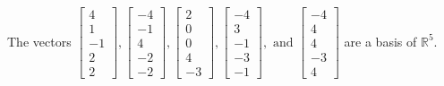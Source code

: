 \begin{exercise}
\begin{exerciseStatement}
  \end{exerciseStatement}
  \begin{exerciseAnswer}
   The vectors \(\left[\begin{array}{r}
4 \\
1 \\
-1 \\
2 \\
2
\end{array}\right] , \left[\begin{array}{r}
-4 \\
-1 \\
4 \\
-2 \\
-2
\end{array}\right] , \left[\begin{array}{r}
2 \\
0 \\
0 \\
4 \\
-3
\end{array}\right] , \left[\begin{array}{r}
-4 \\
3 \\
-1 \\
-3 \\
-1
\end{array}\right] , \text{ and } \left[\begin{array}{r}
-4 \\
4 \\
4 \\
-3 \\
4
\end{array}\right]\) 
  	 are  a basis of \(\mathbb{R}^5\).
  


  \end{exerciseAnswer}
\end{exercise}